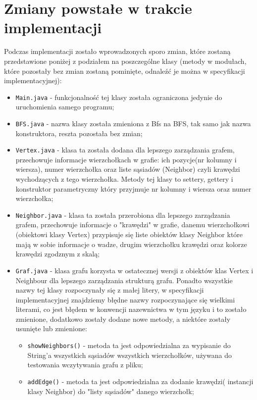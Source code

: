 \documentclass[]{article}
\begin{document}
\section{Zmiany powstałe w trakcie implementacji}\label{header-n233}
 Podczas implementacji zostało wprowadzonych sporo zmian, które zostaną przedstawione poniżej z podziałem na poszczególne klasy (metody w modułach, które pozostały bez zmian zostaną pominięte, odnaleźć je można w specyfikacji implementacyjnej):
\begin{itemize}
\item
\texttt{Main.java} - funkcjonalność tej klasy została ograniczona jedynie do uruchomienia samego programu;
\item
\texttt{BFS.java} - nazwa klasy została zmieniona z Bfs na BFS, tak samo jak nazwa konstruktora, reszta pozostała bez zmian;
\item
\texttt{Vertex.java} - klasa ta została dodana dla lepszego zarządzania grafem, przechowuje informacje wierzchołkach w grafie: ich pozycje(nr kolumny i wiersza), numer wierzchołka oraz liste sąsiadów (Neighbor) czyli krawędzi wychodzących z tego wierzchołka. Metody tej klasy to settery, gettery i konstruktor parametryczny który przyjmuje nr kolumny i wiersza oraz numer wierzchołka;
\item
\texttt{Neighbor.java} - klasa ta została przerobiona dla lepszego zarządzania grafem, przechowuje informacje o "krawędzi" w grafie, danemu wierzchołkowi (obiektowi klasy Vertex) przypisuje się liste obiektów klasy Neighbor które mają w sobie informacje o wadze, drugim wierzchołku krawędzi oraz kolorze krawędzi zgodznym z skalą;
\item
\texttt{Graf.java} - klasa grafu korzysta w ostatecznej wersji z obiektów klas Vertex i Neighbour dla lepszego zarządzania strukturą grafu. Ponadto wszystkie nazwy tej klasy rozpoczynały się z małej litery, w specyfikacji implementacyjnej znajdziemy błędne nazwy rozpoczynające się wielkimi literami, co jest błędem w konwencji nazewnictwa w tym języku i to zostało zmienione, dodatkowo zostały dodane nowe metody, a niektóre zostały usunięte lub zmienione:
\begin{itemize}
\item
\texttt{showNeighbors()} - metoda ta jest odpowiedzialna za wypisanie do String'a wszystkich sąsiadów wszystkich wierzchołków, używana do testowania wczytywania grafu z pliku;
\item
\texttt{addEdge()} - metoda ta jest odpowiedzialna za dodanie krawędzi( instancji klasy Neighbor) do "listy sąsiadów" danego wierzchołk;

\end{itemize}
\end{itemize}
\end{document}
